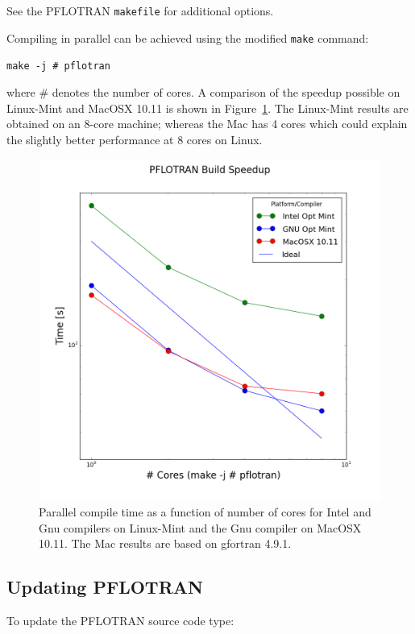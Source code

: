 {\noindent
See the PFLOTRAN \verb|makefile| for additional options.

\noindent
Compiling in parallel can be achieved using the modified \texttt{make} command:

\verb|make -j # pflotran|

\noindent
where \# denotes the number of cores. A comparison of the speedup possible on Linux-Mint and MacOSX 10.11 is shown in Figure~\ref{fcompile}. The Linux-Mint results are obtained on an 8-core machine; whereas the Mac has 4 cores which could explain the slightly better performance at 8 cores on Linux.

\begin{figure}[h]\centering
\includegraphics[scale=0.5]{./figs/linux-mac.png}
\caption{Parallel compile time as a function of number of cores for Intel and Gnu compilers on Linux-Mint and the Gnu compiler on MacOSX 10.11. The Mac results are based on gfortran 4.9.1.}
\label{fcompile}
\end{figure}

\subsection{Updating PFLOTRAN}

To update the PFLOTRAN source code
type: 

}
